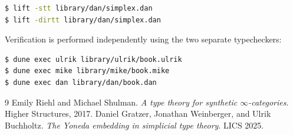 \documentclass[11pt]{article}
\begin{document}
\begin{lstlisting}[language=bash]
$ lift -stt library/dan/simplex.dan
$ lift -dirtt library/dan/simplex.dan
\end{lstlisting}

Verification is performed independently using the two separate typecheckers:
\begin{lstlisting}[language=bash]
$ dune exec ulrik library/ulrik/book.ulrik
$ dune exec mike library/mike/book.mike
$ dune exec dan library/dan/book.dan
\end{lstlisting}

\begin{thebibliography}{9}
Emily Riehl and Michael Shulman.
\textit{A type theory for synthetic \(\infty\)-categories}.
Higher Structures, 2017.
Daniel Gratzer, Jonathan Weinberger, and Ulrik Buchholtz.
\textit{The Yoneda embedding in simplicial type theory}.
LICS 2025.
\end{thebibliography}
\end{document}
